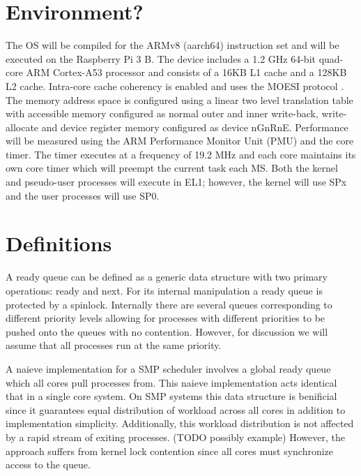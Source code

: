 \documentclass[11pt, twocolumn]{proc}
\begin{document}
\section{Environment?}
\label{sec:environment?}
The OS will be compiled for the ARMv8 (aarch64) instruction set and will be executed on the Raspberry Pi 3 B.  The device includes a 1.2 GHz 64-bit quad-core ARM Cortex-A53 processor and consists of a 16KB L1 cache and a 128KB L2 cache.  Intra-core cache coherency is enabled and uses the MOESI protocol \cite{arm-dcache-coherency}.  The memory address space is configured using a linear two level translation table with accessible memory configured as normal outer and inner write-back, write-allocate and device register memory configured as device nGnRnE.  Performance will be measured using the ARM Performance Monitor Unit (PMU) and the core timer.  The timer executes at a frequency of 19.2 MHz \cite{bcm2386} and each core maintains its own core timer which will preempt the current task each MS.  Both the kernel and pseudo-user processes will execute in EL1; however, the kernel will use SPx and the user processes will use SP0.

\section{Definitions}
\label{sec:definitions}

A ready queue can be defined as a generic data structure with two primary operations: ready and next.  For its internal manipulation a ready queue is protected by a spinlock.  Internally there are several queues corresponding to different priority levels allowing for processes with different priorities to be pushed onto the queues with no contention.  However, for discussion we will assume that all processes run at the same priority.

A naieve implementation for a SMP scheduler involves a global ready queue which all cores pull processes from.  This naieve implementation acts identical that in a single core system.  On SMP systems this data structure is benificial since it guarantees equal distribution of workload across all cores in addition to implementation simplicity.  Additionally, this workload distribution is not affected by a rapid stream of exiting processes. (TODO possibly example)  However, the approach suffers from kernel lock contention since all cores must synchronize access to the queue.
\end{document}
